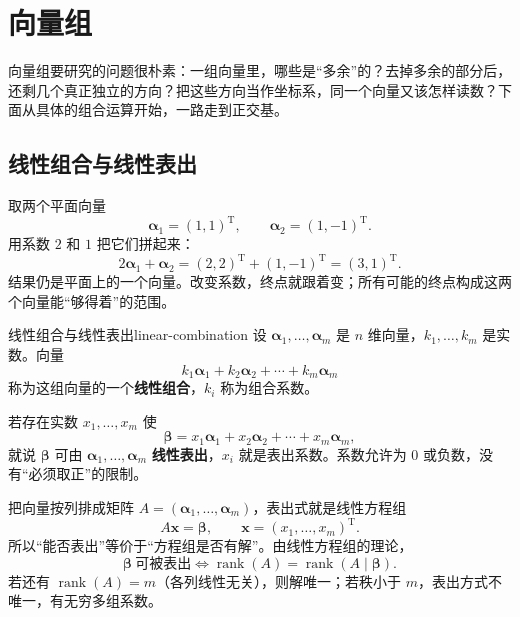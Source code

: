 \section{向量组}

向量组要研究的问题很朴素：一组向量里，哪些是“多余”的？去掉多余的部分后，还剩几个真正独立的方向？把这些方向当作坐标系，同一个向量又该怎样读数？下面从具体的组合运算开始，一路走到正交基。

\subsection{线性组合与线性表出}

取两个平面向量
\[
\boldsymbol{\alpha}_1=(1,1)^{\mathrm T},\qquad \boldsymbol{\alpha}_2=(1,-1)^{\mathrm T}.
\]
用系数 $2$ 和 $1$ 把它们拼起来：
\[
2\boldsymbol{\alpha}_1+\boldsymbol{\alpha}_2
=(2,2)^{\mathrm T}+(1,-1)^{\mathrm T}=(3,1)^{\mathrm T}.
\]
结果仍是平面上的一个向量。改变系数，终点就跟着变；所有可能的终点构成这两个向量能“够得着”的范围。

\begin{mydef}{线性组合与线性表出}{linear-combination}
设 $\boldsymbol{\alpha}_1,\ldots,\boldsymbol{\alpha}_m$ 是 $n$ 维向量，$k_1,\ldots,k_m$ 是实数。向量
\[
k_1\boldsymbol{\alpha}_1+k_2\boldsymbol{\alpha}_2+\cdots+k_m\boldsymbol{\alpha}_m
\]
称为这组向量的一个\textbf{线性组合}，$k_i$ 称为组合系数。

若存在实数 $x_1,\ldots,x_m$ 使
\[
\boldsymbol{\beta}=x_1\boldsymbol{\alpha}_1+x_2\boldsymbol{\alpha}_2+\cdots+x_m\boldsymbol{\alpha}_m,
\]
就说 $\boldsymbol{\beta}$ 可由 $\boldsymbol{\alpha}_1,\ldots,\boldsymbol{\alpha}_m$ \textbf{线性表出}，$x_i$ 就是表出系数。系数允许为 $0$ 或负数，没有“必须取正”的限制。
\end{mydef}

把向量按列排成矩阵 $A=(\boldsymbol{\alpha}_1,\ldots,\boldsymbol{\alpha}_m)$，表出式就是线性方程组
\[
A\boldsymbol{x}=\boldsymbol{\beta},\qquad \boldsymbol{x}=(x_1,\ldots,x_m)^{\mathrm T}.
\]
所以“能否表出”等价于“方程组是否有解”。由线性方程组的理论，
\[
\boldsymbol{\beta}\ \text{可被表出}\iff \operatorname{rank}(A)=\operatorname{rank}(A\mid\boldsymbol{\beta}).
\]
若还有 $\operatorname{rank}(A)=m$（各列线性无关），则解唯一；若秩小于 $m$，表出方式不唯一，有无穷多组系数。

